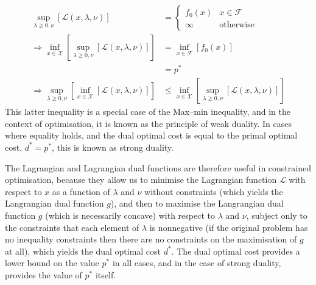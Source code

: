 \begin{align}
    \underset{\lambda \ge 0, \nu}{\sup}\left[ \mathcal{L}(x, \lambda, \nu) \right] &= \begin{cases}
        f_0(x) & x \in \mathcal{F} \\
        \infty & \text{otherwise}
    \end{cases} \\
    \Rightarrow \underset{x\in\mathcal{X}}{\inf}\left[\underset{\lambda \ge 0, \nu}{\sup}\left[\mathcal{L}(x, \lambda, \nu)\right]\right] &= \underset{x\in\mathcal{F}}{\inf}\left[f_0(x)\right] \\
    &= p^* \\
    \Rightarrow \underset{\lambda \ge 0, \nu}{\sup}\left[\underset{x\in\mathcal{X}}{\inf}\left[\mathcal{L}(x, \lambda, \nu)\right]\right] &\le \underset{x\in\mathcal{X}}{\inf}\left[\underset{\lambda \ge 0, \nu}{\sup}\left[\mathcal{L}(x, \lambda, \nu)\right]\right]
\end{align}
This latter inequality is a special case of the Max–min inequality, and in the context of optimisation, it is known as the principle of weak duality. In cases where equality holds, and the dual optimal cost is equal to the primal optimal cost, $d^* = p^*$, this is known as strong duality.

The Lagrangian and Lagrangian dual functions are therefore useful in constrained optimisation, because they allow us to minimise the Lagrangian function $\mathcal{L}$ with respect to $x$ as a function of $\lambda$ and $\nu$ without constraints (which yields the Langrangian dual function $g$), and then to maximise the Langrangian dual function $g$ (which is necessarily concave) with respect to $\lambda$ and $\nu$, subject only to the constraints that each element of $\lambda$ is nonnegative (if the original problem has no inequality constraints then there are no constraints on the maximisation of $g$ at all), which yields the dual optimal cost $d^*$. The dual optimal cost provides a lower bound on the value $p^*$ in all cases, and in the case of strong duality, provides the value of $p^*$ itself.
